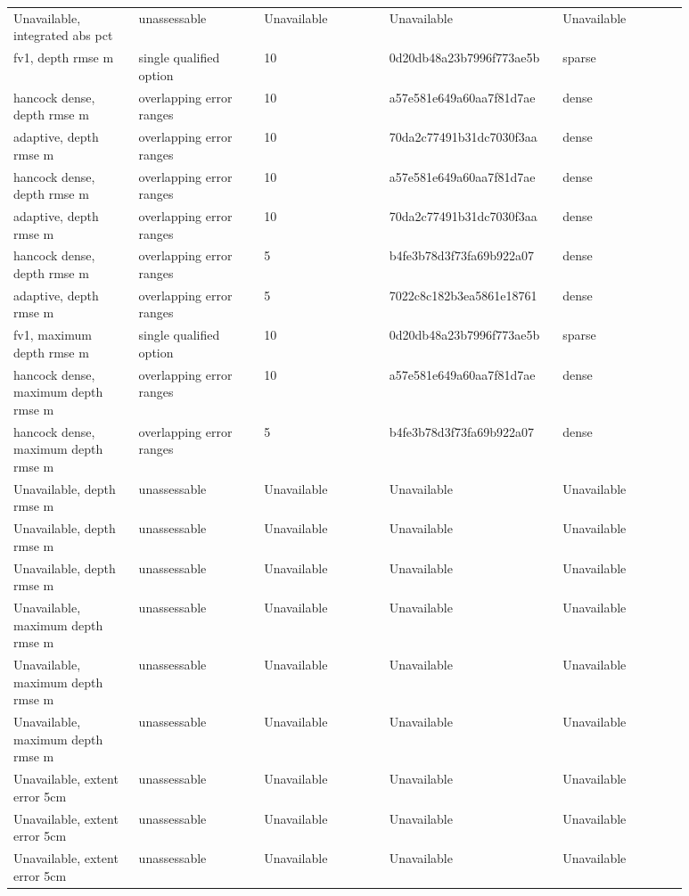 \begin{longtable}{p{0.1760\linewidth}p{0.1760\linewidth}p{0.1760\linewidth}p{0.1760\linewidth}p{0.1760\linewidth}}
Unavailable, integrated abs pct & unassessable & Unavailable & Unavailable & Unavailable \\
fv1, depth rmse m & single qualified option & 10 & 0d20db48a23b7996f773ae5b & sparse \\
hancock dense, depth rmse m & overlapping error ranges & 10 & a57e581e649a60aa7f81d7ae & dense \\
adaptive, depth rmse m & overlapping error ranges & 10 & 70da2c77491b31dc7030f3aa & dense \\
hancock dense, depth rmse m & overlapping error ranges & 10 & a57e581e649a60aa7f81d7ae & dense \\
adaptive, depth rmse m & overlapping error ranges & 10 & 70da2c77491b31dc7030f3aa & dense \\
hancock dense, depth rmse m & overlapping error ranges & 5 & b4fe3b78d3f73fa69b922a07 & dense \\
adaptive, depth rmse m & overlapping error ranges & 5 & 7022c8c182b3ea5861e18761 & dense \\
fv1, maximum depth rmse m & single qualified option & 10 & 0d20db48a23b7996f773ae5b & sparse \\
hancock dense, maximum depth rmse m & overlapping error ranges & 10 & a57e581e649a60aa7f81d7ae & dense \\
hancock dense, maximum depth rmse m & overlapping error ranges & 5 & b4fe3b78d3f73fa69b922a07 & dense \\
Unavailable, depth rmse m & unassessable & Unavailable & Unavailable & Unavailable \\
Unavailable, depth rmse m & unassessable & Unavailable & Unavailable & Unavailable \\
Unavailable, depth rmse m & unassessable & Unavailable & Unavailable & Unavailable \\
Unavailable, maximum depth rmse m & unassessable & Unavailable & Unavailable & Unavailable \\
Unavailable, maximum depth rmse m & unassessable & Unavailable & Unavailable & Unavailable \\
Unavailable, maximum depth rmse m & unassessable & Unavailable & Unavailable & Unavailable \\
Unavailable, extent error 5cm & unassessable & Unavailable & Unavailable & Unavailable \\
Unavailable, extent error 5cm & unassessable & Unavailable & Unavailable & Unavailable \\
Unavailable, extent error 5cm & unassessable & Unavailable & Unavailable & Unavailable \\

\end{longtable}
